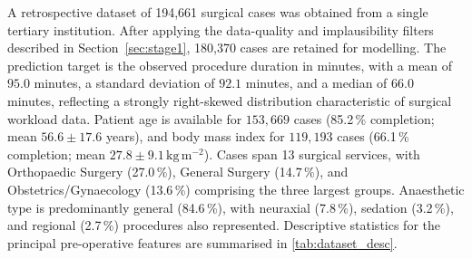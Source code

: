 \documentclass[3p]{elsarticle}
\begin{document}
A retrospective dataset of 194{,}661 surgical cases was obtained from a single tertiary institution. After applying the data-quality and implausibility filters described in Section~\ref{sec:stage1}, 180{,}370 cases are retained for modelling. The prediction target is the observed procedure duration in minutes, with a mean of $95.0$ minutes, a standard deviation of $92.1$ minutes, and a median of $66.0$ minutes, reflecting a strongly right-skewed distribution characteristic of surgical workload data. Patient age is available for $153{,}669$ cases (85.2\,\% completion; mean $56.6 \pm 17.6$ years), and body mass index for $119{,}193$ cases (66.1\,\% completion; mean $27.8 \pm 9.1\,\text{kg}\,\text{m}^{-2}$). Cases span 13 surgical services, with Orthopaedic Surgery (27.0\,\%), General Surgery (14.7\,\%), and Obstetrics/Gynaecology (13.6\,\%) comprising the three largest groups. Anaesthetic type is predominantly general (84.6\,\%), with neuraxial (7.8\,\%), sedation (3.2\,\%), and regional (2.7\,\%) procedures also represented. Descriptive statistics for the principal pre-operative features are summarised in \cref{tab:dataset_desc}.
\end{document}
